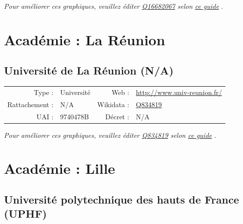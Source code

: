 \documentclass[12pt,french,landscape]{article}
\begin{document}
\textit{\scriptsize Pour améliorer ces graphiques, veuillez éditer \href{https://www.wikidata.org/entity/Q16682067}{Q16682067}  selon \href{https://github.com/cpesr/wikidataESR/blob/master/Rmd/wikidataESR.md}{ce guide}}
.


\newpage

\hypertarget{acaduxe9mie-la-ruxe9union}{%
\section{Académie : La Réunion}\label{acaduxe9mie-la-ruxe9union}}

\hypertarget{universituxe9-de-la-ruxe9union-na}{%
\subsection{Université de La Réunion
(N/A)}\label{universituxe9-de-la-ruxe9union-na}}

\begin{tabular*}{0.45\textwidth}{rp{2cm}rl}  
\hline  
Type : & Université & Web : &\href{http://www.univ-reunion.fr/}{http://www.univ-reunion.fr/} \\  
Rattachement : & N/A & Wikidata : & \href{https://www.wikidata.org/entity/Q834819}{Q834819} \\  
UAI : & 9740478B & Décret : & N/A \\  
\hline  
\end{tabular*}

\textit{\scriptsize Pour améliorer ces graphiques, veuillez éditer \href{https://www.wikidata.org/entity/Q834819}{Q834819}  selon \href{https://github.com/cpesr/wikidataESR/blob/master/Rmd/wikidataESR.md}{ce guide}}
.


\newpage

\hypertarget{acaduxe9mie-lille}{%
\section{Académie : Lille}\label{acaduxe9mie-lille}}

\hypertarget{universituxe9-polytechnique-des-hauts-de-france-uphf}{%
\subsection{Université polytechnique des hauts de France
(UPHF)}\label{universituxe9-polytechnique-des-hauts-de-france-uphf}}
\end{document}
